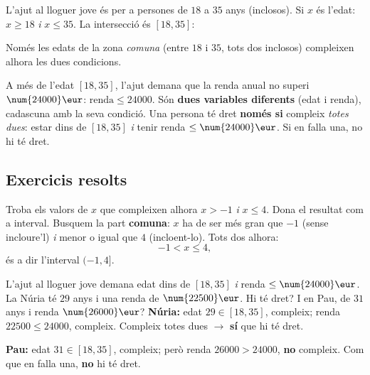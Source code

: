 \begin{exemple}
L'ajut al lloguer jove és per a persones de $18$ a $35$ anys (inclosos). Si $x$ és
l'edat: $x\ge 18$ \emph{i} $x\le 35$. La intersecció és $[18,35]$:

\begin{center}
\end{center}

\noindent Només les edats de la zona \emph{comuna} (entre $18$ i $35$, tots dos
inclosos) compleixen alhora les dues condicions.
\end{exemple}

\begin{exemple}
A més de l'edat $[18,35]$, l'ajut demana que la renda anual no superi $\num{24000}\eur$:
$\text{renda}\le\num{24000}$. Són \textbf{dues variables diferents} (edat i renda),
cadascuna amb la seva condició. Una persona té dret \textbf{només si} compleix
\emph{totes dues}: estar dins de $[18,35]$ \emph{i} tenir renda $\le\num{24000}\eur$.
Si en falla una, no hi té dret.
\end{exemple}

\subsection{Exercicis resolts}

\begin{exresolt}
Troba els valors de $x$ que compleixen alhora $x>-1$ \emph{i} $x\le 4$. Dona el
resultat com a interval.
\solucio
Busquem la part \textbf{comuna}: $x$ ha de ser més gran que $-1$ (sense incloure'l)
\emph{i} menor o igual que $4$ (incloent-lo). Tots dos alhora:
\[
-1<x\le 4,
\]
és a dir l'interval $(-1,4]$.
\resposta{$(-1,4]$.}
\end{exresolt}

\begin{exresolt}
L'ajut al lloguer jove demana edat dins de $[18,35]$ \emph{i} renda $\le\num{24000}\eur$.
La Núria té $29$ anys i una renda de $\num{22500}\eur$. Hi té dret? I en Pau, de
$31$ anys i renda $\num{26000}\eur$?
\solucio
\textbf{Núria:} edat $29\in[18,35]$, compleix; renda $\num{22500}\le\num{24000}$,
compleix. Compleix totes dues $\rightarrow$ \textbf{sí} que hi té dret.

\textbf{Pau:} edat $31\in[18,35]$, compleix; però renda
$\num{26000}>\num{24000}$, \textbf{no} compleix. Com que en falla una, \textbf{no}
hi té dret.
\end{exresolt}

